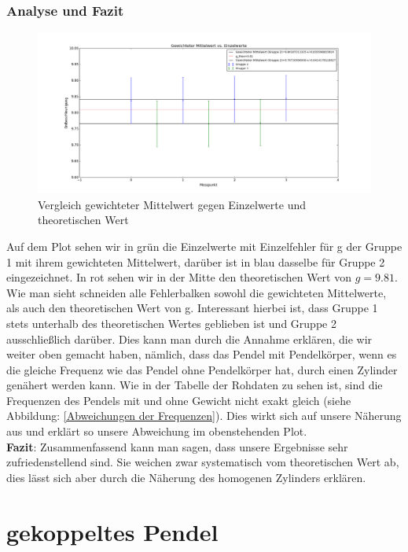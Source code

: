 \documentclass[12pt,a4paper]{article}
\begin{document}
\subsubsection{Analyse und Fazit}
\begin{figure}[H]
\caption{Vergleich gewichteter Mittelwert gegen Einzelwerte und theoretischen Wert}
\centering
\includegraphics[scale=0.4]{Bilder/Erdbeschleunigung_alle_besserer_fehler.png}
\end{figure}
Auf dem Plot sehen wir in grün die Einzelwerte mit Einzelfehler für g der Gruppe 1 mit ihrem gewichteten Mittelwert, darüber ist in blau dasselbe für Gruppe 2 eingezeichnet. In rot sehen wir in der Mitte den theoretischen Wert von $g=9.81$.
\newline
Wie man sieht schneiden alle Fehlerbalken sowohl die gewichteten Mittelwerte, als auch den theoretischen Wert von g. Interessant hierbei ist, dass Gruppe 1 stets unterhalb des theoretischen Wertes geblieben ist und Gruppe 2 ausschließlich darüber.
Dies kann man durch die Annahme erklären, die wir weiter oben gemacht haben, nämlich, dass das Pendel mit Pendelkörper, wenn es die gleiche Frequenz wie das Pendel ohne Pendelkörper hat, durch einen Zylinder genähert werden kann. 
Wie in der Tabelle der Rohdaten zu sehen ist, sind die Frequenzen des Pendels mit und ohne Gewicht nicht exakt gleich (siehe Abbildung: \ref{Abweichungen der Frequenzen}). Dies wirkt sich auf unsere Näherung aus und erklärt so unsere Abweichung im obenstehenden Plot.\\

\textbf{Fazit}: \newline
Zusammenfassend kann man sagen, dass unsere Ergebnisse sehr zufriedenstellend sind. Sie weichen zwar systematisch vom theoretischen Wert ab, dies lässt sich aber durch die Näherung des homogenen Zylinders erklären.

\section{gekoppeltes Pendel}
\end{document}
